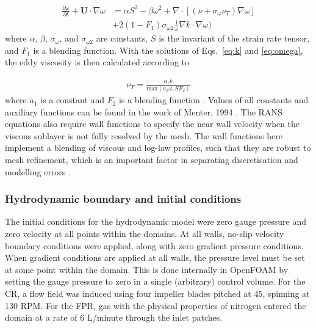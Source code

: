 \begin{align}
\frac{\partial \omega}{\partial t} + \mathbf{U} \cdot \nabla \omega &= \alpha S^2 - \beta \omega ^2 + \nabla \cdot \left[(\nu + \sigma_\omega \nu_T ) \nabla \omega  \right] \nonumber \\ 
&+ 2 (1 - F_1) \sigma_{\omega 2} \frac{1}{\omega} \nabla k \cdot \nabla \omega)
\label{eq:omega}
\end{align}
%
where $\alpha$, $\beta$, $\sigma_\omega$, and $\sigma_{\omega 2}$ are constants, $S$ is the invariant of the strain rate tensor, and $F_1$ is a blending function.
\skippingparagraph
With the solutions of Eqs.\ \ref{eq:k} and \ref{eq:omega}, the eddy viscosity is then calculated according to

\begin{align}
\nu_T = \frac{a_1 k}{\text{max}(a_1\omega, SF_2)}
\end{align}
%
where $a_1$ is a constant and $F_2$ is a blending function \cite{menter1994}. Values of all constants and auxiliary functions can be found in the work of Menter, 1994 \cite{menter1994}.
\skippingparagraph
The RANS equations also require wall functions to specify the near wall velocity when the viscous sublayer is not fully resolved by the mesh. The wall functions here implement a blending of viscous and log-law profiles, such that they are robust to mesh refinement, which is an important factor in separating discretisation and modelling errors \cite{menter2003}.

\subsubsection{Hydrodynamic boundary and initial conditions}

The initial conditions for the hydrodynamic model were zero gauge pressure and zero velocity at all points within the domains. At all walls, no-slip velocity boundary conditions were applied, along with zero gradient pressure conditions. When gradient conditions are applied at all walls, the pressure level must be set at some point within the domain. This is done internally in OpenFOAM by setting the gauge pressure to zero in a single (arbitrary) control volume. For the CR, a flow field was induced using four impeller blades pitched at 45\degree, spinning at 130 RPM. For the FPR, gas with the physical properties of nitrogen entered the domain at a rate of 6 L/minute through the inlet patches. 

